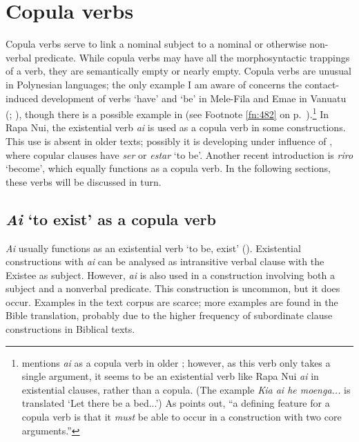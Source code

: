 \section{Copula verbs}\label{sec:9.6}
Copula verbs serve to link a nominal subject to a nominal or otherwise non-verbal predicate. While copula verbs may have all the morphosyntactic trappings of a verb, they are semantically empty \citep[115]{Payne1997} or nearly empty. 
Copula verbs are unusual in Polynesian languages; the only example I am aware of concerns the contact-induced development of verbs ‘have’ and ‘be’ in Mele-Fila and Emae in Vanuatu (\citealt[337]{Clark1986}; \citealt[119]{Clark1994}), though there is a possible example in  (see Footnote \ref{fn:482} on p.~\pageref{fn:482}).\footnote{\label{fn:480}\citet[154]{Harlow2007Maori} mentions \textit{ai} as a copula verb in older ; however, as this verb only takes a single argument, it seems to be an existential verb like Rapa Nui \textit{ai} in existential clauses, rather than a copula. (The example \textit{Kia ai he moenga...} is translated ‘Let there be a bed...’) As \citet[160]{Dixon2010-2} points out, “a defining feature for a copula verb is that it \textit{must} be able to occur in a construction with two core arguments.”}  In Rapa Nui, the existential verb \textit{ai} is used as a copula verb in some constructions. This use is absent in older texts; possibly it is developing under influence of , where copular clauses have \textit{ser} or \textit{estar} ‘to be’. Another recent introduction is \textit{riro} ‘become’, which equally functions as a copula verb. In the following sections, these verbs will be discussed in turn.

\subsection{\textit{Ai} ‘to exist’ as a copula verb}\label{sec:9.6.1}

\textit{Ai} usually functions as an existential verb ‘to be, exist’ (). Existential constructions with \textit{ai} can be analysed as intransitive verbal clause with the Existee as subject. However, \textit{ai} is also used in a construction involving both a subject and a nonverbal predicate. This construction is uncommon, but it does occur. Examples in the text corpus are scarce; more examples are found in the Bible translation, probably due to the higher frequency of subordinate clause constructions in Biblical texts.

